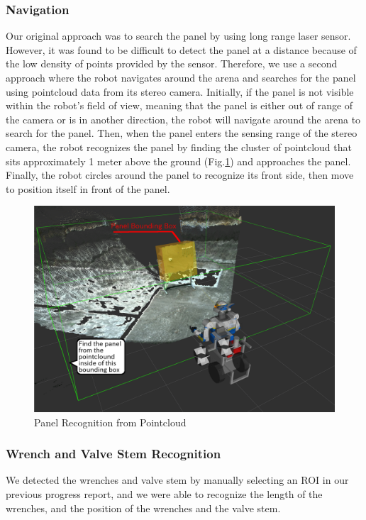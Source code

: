 \subsubsection{Navigation}
Our original approach was to search the panel by using long range laser sensor.
However, it was found to be difficult to detect the panel at a distance because of the low density of points provided by the sensor.
Therefore, we use a second approach where the robot navigates around the arena and searches for the panel using pointcloud data from its stereo camera.
Initially, if the panel is not visible within the robot's field of view, meaning that the panel is either out of range of the camera or is in another direction, the robot will navigate around the arena to search for the panel.
Then, when the panel enters the sensing range of the stereo camera, the robot recognizes the panel by finding
the cluster of pointcloud that sits approximately 1 meter above the ground (Fig.\ref{fig: task2_panel-recognition}) and approaches the panel.
Finally, the robot circles around the panel to recognize its front side, then move to position itself in front of the panel.

\begin{figure}[htb]
  \begin{center}
    \includegraphics[width=0.80\columnwidth]{sections/task2/images/panel_detect.png}
    \caption{Panel Recognition from Pointcloud}
    \label{fig: task2_panel-recognition}
  \end{center}
\end{figure}

\subsubsection{Wrench and Valve Stem Recognition}
We detected the wrenches and valve stem by manually selecting an ROI in our previous progress report, and we were able to recognize
the length of the wrenches, and the position of the wrenches and the valve stem.

